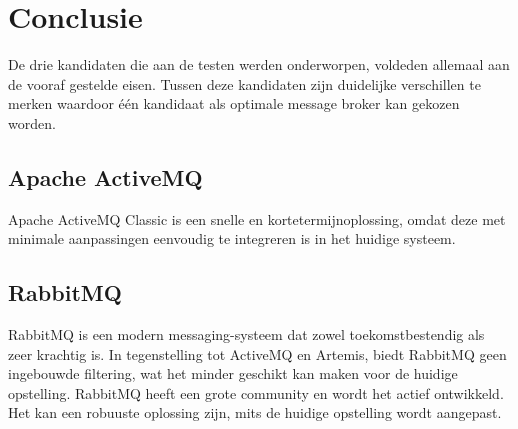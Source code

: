 
\chapter{Conclusie}%
\label{ch:conclusie}


De drie kandidaten die aan de testen werden onderworpen, voldeden allemaal aan de vooraf gestelde eisen.
Tussen deze kandidaten zijn duidelijke verschillen te merken waardoor één kandidaat als optimale message broker kan gekozen worden.

\section{Apache ActiveMQ}
Apache ActiveMQ Classic is een snelle en kortetermijnoplossing, 
omdat deze met minimale aanpassingen eenvoudig te integreren is in het huidige systeem.

\section{RabbitMQ}
RabbitMQ is een modern messaging-systeem dat zowel toekomstbestendig als zeer krachtig is. 
In tegenstelling tot ActiveMQ en Artemis, biedt RabbitMQ geen ingebouwde filtering, wat het minder geschikt kan maken voor de huidige opstelling.
RabbitMQ heeft een grote community en wordt het actief ontwikkeld. Het kan een robuuste oplossing zijn, 
mits de huidige opstelling wordt aangepast.

